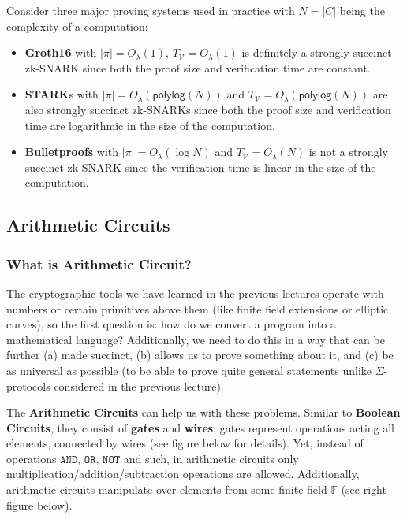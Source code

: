 \documentclass[../lecture-notes.tex]{subfiles}
\begin{document}
\begin{example}
    Consider three major proving systems used in practice with $N=|C|$ being the complexity of a computation:
    \begin{itemize}
        \item \textbf{Groth16} with $|\pi| = O_{\lambda}(1)$, $T_{\mathcal{V}} = O_{\lambda}(1)$ is definitely a strongly succinct zk-SNARK since both the proof size and verification time are constant.
        \item \textbf{STARK}s with $|\pi| = O_{\lambda}(\mathsf{polylog}(N))$ and $T_{\mathcal{V}} = O_{\lambda}(\mathsf{polylog}(N))$ are also strongly succinct zk-SNARKs since both the proof size and verification time are logarithmic in the size of the computation.
        \item \textbf{Bulletproofs} with $|\pi| = O_{\lambda}(\log N)$ and $T_{\mathcal{V}} = O_{\lambda}(N)$ is not a strongly succinct zk-SNARK since the verification time is linear in the size of the computation.
    \end{itemize}
\end{example}

\subsection{Arithmetic Circuits}

\subsubsection{What is Arithmetic Circuit?}
The cryptographic tools we have learned in the previous lectures operate with numbers or certain 
primitives above them (like finite field extensions or elliptic curves), so the first question is: how do we convert a program into a mathematical 
language? Additionally, we need to do this in a way that can be further (a) made succinct, (b) allows us to prove 
something about it, and (c) be as universal as possible (to be able to prove quite general statements unlike $\Sigma$-protocols considered in the previous lecture).

The \textbf{Arithmetic Circuits} can help us with these problems. Similar to \textbf{Boolean Circuits}, they consist of \textbf{gates} and 
\textbf{wires}: gates represent operations acting all elements, connected by wires (see figure below for details). Yet, instead of operations $\mathtt{AND}$, $\mathtt{OR}$, $\mathtt{NOT}$ and such, in arithmetic circuits only 
multiplication/addition/subtraction operations are allowed. Additionally, arithmetic circuits manipulate over elements
from some finite field $\mathbb{F}$ (see right figure below).
\end{document}
